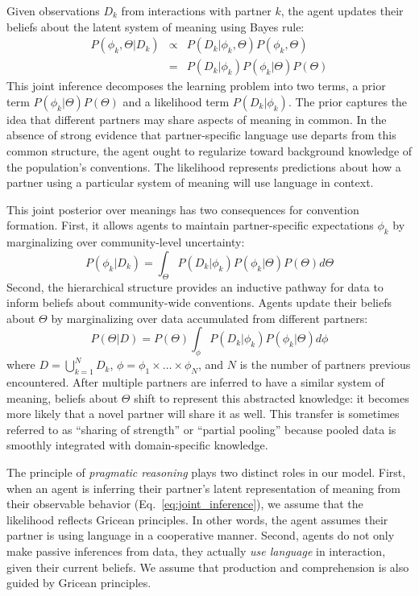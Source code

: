 Given observations $D_k$ from interactions with partner $k$, the agent updates their beliefs about the latent system of meaning using Bayes rule:
\begin{equation}
\begin{array}{rcl}
\label{eq:joint_inference}
P(\phi_k, \Theta | D_k)  & \propto &  P(D_k | \phi_k, \Theta) P(\phi_k, \Theta) \\
                           & =   & P(D_k | \phi_k) P(\phi_k | \Theta) P(\Theta)
\end{array}
\end{equation}
This joint inference decomposes the learning problem into two terms, a prior term $P(\phi_k | \Theta)P(\Theta)$ and a likelihood term $P(D_k | \phi_k)$.
The prior captures the idea that different partners may share aspects of meaning in common.
In the absence of strong evidence that partner-specific language use departs from this common structure, the agent ought to regularize toward background knowledge of the population's conventions.
The likelihood represents predictions about how a partner using a particular system of meaning will use language in context.

This joint posterior over meanings has two consequences for convention formation.
First, it allows agents to maintain partner-specific expectations $\phi_k$ by marginalizing over community-level uncertainty:
\begin{equation}
P(\phi_k | D_k) = \int_{\Theta}P(D_k | \phi_k) P(\phi_k | \Theta) P(\Theta)  d\Theta
\end{equation}
Second, the hierarchical structure provides an inductive pathway for data to inform beliefs about community-wide conventions.
Agents update their beliefs about $\Theta$ by marginalizing over data accumulated from different partners:
\begin{equation}
P(\Theta | D) = P(\Theta) \int_{\phi} P(D_k | \phi_k) P(\phi_k | \Theta) d\phi
\end{equation}
where $D = \bigcup_{k=1}^N D_k$, $\phi = \phi_1 \times \dots \times \phi_N$, and $N$ is the number of partners previous encountered. 
After multiple partners are inferred to have a similar system of meaning, beliefs about $\Theta$ shift to represent this abstracted knowledge: it becomes more likely that a novel partner will share it as well.
This transfer is sometimes referred to as ``sharing of strength'' or ``partial pooling'' because pooled data is smoothly integrated with domain-specific knowledge.

The principle of \textit{pragmatic reasoning} plays two distinct roles in our model.
First, when an agent is inferring their partner's latent representation of meaning from their observable behavior (Eq.~\ref{eq:joint_inference}), we assume that the likelihood reflects Gricean principles.
In other words, the agent assumes their partner is using language in a cooperative manner.
Second, agents do not only make passive inferences from data, they actually \emph{use language} in interaction, given their current beliefs.
We assume that production and comprehension is also guided by Gricean principles.


